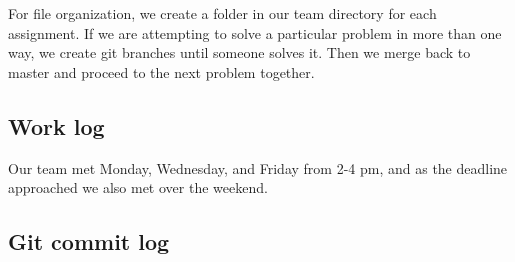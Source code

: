 \documentclass[journal,10pt,onecolumn,compsoc,letterpaper,draftclsnofoot,table,xcdraw]{IEEEtran} \usepackage[margin=0.75in]{geometry}
\begin{document}
For file organization, we create a folder in our team directory for each assignment.  If we are attempting to solve a particular problem in more than one way, we create git branches until someone solves it.  Then we merge back to master and proceed to the next problem together.

\subsection{Work log}

\noindent Our team met Monday, Wednesday, and Friday from 2-4 pm, and as the deadline approached we also met over the weekend.

\subsection{Git commit log}
\end{document}
